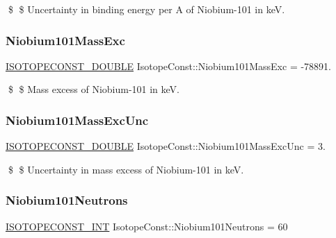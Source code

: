 \$ \$ Uncertainty in binding energy per A of Niobium-\/101 in keV. \mbox{\label{group___isotope_const-_niobium-_nb101_ga785c3f13fa7bc0a9de51c4c062a6fa87}} 
\subsubsection{\texorpdfstring{Niobium101\+Mass\+Exc}{Niobium101MassExc}}
{\footnotesize\ttfamily \mbox{\hyperlink{group___isotope_const-_macros_ga8f45a7272ce02c0b4c65c44636ed719a}{I\+S\+O\+T\+O\+P\+E\+C\+O\+N\+S\+T\+\_\+\+D\+O\+U\+B\+LE}} Isotope\+Const\+::\+Niobium101\+Mass\+Exc = -\/78891.}

\$ \$ Mass excess of Niobium-\/101 in keV. \mbox{\label{group___isotope_const-_niobium-_nb101_gae2625449338bddaa04713c09577c462a}} 
\subsubsection{\texorpdfstring{Niobium101\+Mass\+Exc\+Unc}{Niobium101MassExcUnc}}
{\footnotesize\ttfamily \mbox{\hyperlink{group___isotope_const-_macros_ga8f45a7272ce02c0b4c65c44636ed719a}{I\+S\+O\+T\+O\+P\+E\+C\+O\+N\+S\+T\+\_\+\+D\+O\+U\+B\+LE}} Isotope\+Const\+::\+Niobium101\+Mass\+Exc\+Unc = 3.}

\$ \$ Uncertainty in mass excess of Niobium-\/101 in keV. \mbox{\label{group___isotope_const-_niobium-_nb101_ga9ff450a133b25c72f46080b731c1b041}} 
\subsubsection{\texorpdfstring{Niobium101\+Neutrons}{Niobium101Neutrons}}
{\footnotesize\ttfamily \mbox{\hyperlink{group___isotope_const-_macros_ga5f18360b3e99483a35c32d789e62621c}{I\+S\+O\+T\+O\+P\+E\+C\+O\+N\+S\+T\+\_\+\+I\+NT}} Isotope\+Const\+::\+Niobium101\+Neutrons = 60}

